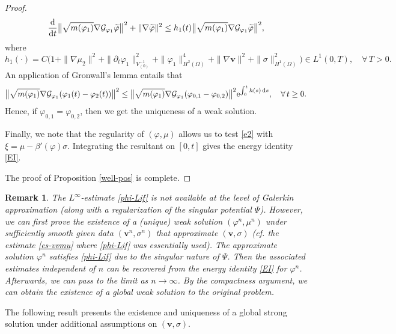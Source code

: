 \documentclass[11pt,reqno]{amsart}
\newtheorem{remark}{\textbf{Remark}}[section]
\def\d{{\rm d}}
\def\ddt{\frac{\d}{\d t}}
\def\vv{\bm{v}}
\begin{document}
\begin{proof}
%
\begin{equation}
\ddt  \big\|\sqrt{m(\varphi_1)} \nabla \mathcal{G}_{\varphi_1} \widetilde{\varphi}\big\|^2
+  \|\nabla \widetilde{\varphi}\|^2
\leq h_1(t) \big\|\sqrt{m(\varphi_1)} \nabla \mathcal{G}_{\varphi_1} \widetilde{\varphi}\big\|^2,
\notag
\end{equation}
where
$$
h_1(\cdot)= C \Big(1+
\|\nabla \mu_2\|^2
+ \|\partial_t \varphi_1\|_{V^{-1}_{(0)}}^2 +
 \|\varphi_1\|_{H^2(\Omega)}^4 + \|\nabla \vv\|^2+ \|\sigma\|^2_{H^1(\Omega)}\Big) \in L^1(0,T), \quad \forall \, T>0.
$$
An application of Gronwall's lemma entails that
%
\begin{equation}
\big\|\sqrt{m(\varphi_1)} \nabla  \mathcal{G}_{\varphi_1} ( \varphi_1(t)-\varphi_2(t))\big\|^2
\leq \big\|\sqrt{m(\varphi_1)} \nabla  \mathcal{G}_{\varphi_1}  ( \varphi_{0,1}-\varphi_{0,2})\big\|^2
\mathrm{e}^{\int_0^t h(s)\, \d s}, \quad \forall \, t \geq 0.
\notag
\end{equation}
%
Hence, if $\varphi_{0,1}=\varphi_{0,2}$, then we get the uniqueness of a weak solution.

Finally, we note that the regularity of $(\varphi, \mu)$ allows us to test \eqref{e2} with $\xi = \mu-\beta'(\varphi)\sigma$. Integrating the resultant on $[0,t]$ gives the energy identity \eqref{EI}.

The proof of Proposition \ref{well-pos} is complete.
\end{proof}
%
\begin{remark}\rm
\label{rem-Linf}
The $L^\infty$-estimate \eqref{phi-Lif} is not available at the level of Galerkin approximation (along with a regularization of the singular potential $\Psi$). However, we can first prove the existence of a (unique) weak solution $(\varphi^n, \mu^n)$ under sufficiently smooth given data $(\vv^n,\sigma^n)$ that approximate $(\vv, \sigma)$ (cf. the estimate \eqref{es-vvmu} where \eqref{phi-Lif} was essentially used). The approximate solution $\varphi^n$ satisfies \eqref{phi-Lif} due to the singular nature of $\Psi$. Then the associated estimates independent of $n$ can be recovered from the energy identity \eqref{EI} for $\varphi^n$. Afterwards, we can pass to the limit as $n\to \infty$. By the compactness argument, we can obtain the existence of a global weak solution to the original problem.
\end{remark}
%

The following result presents the existence and uniqueness of a global strong solution under additional assumptions on $(\vv,\sigma)$.
\end{document}
